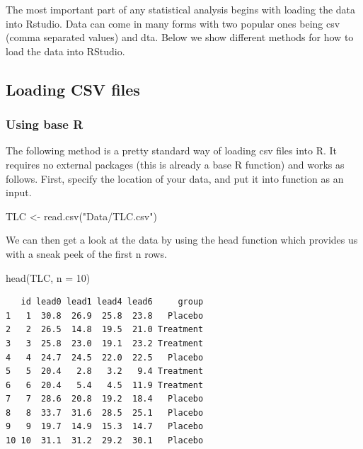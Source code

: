 \documentclass[
  letterpaper,
  DIV=11,
  numbers=noendperiod]{scrreprt}
\newenvironment{Shaded}{\begin{snugshade}}{\end{snugshade}}
\newcommand{\AttributeTok}[1]{\textcolor[rgb]{0.40,0.45,0.13}{#1}}
\newcommand{\DecValTok}[1]{\textcolor[rgb]{0.68,0.00,0.00}{#1}}
\newcommand{\FunctionTok}[1]{\textcolor[rgb]{0.28,0.35,0.67}{#1}}
\newcommand{\NormalTok}[1]{\textcolor[rgb]{0.00,0.23,0.31}{#1}}
\newcommand{\OtherTok}[1]{\textcolor[rgb]{0.00,0.23,0.31}{#1}}
\newcommand{\StringTok}[1]{\textcolor[rgb]{0.13,0.47,0.30}{#1}}
\begin{document}
The most important part of any statistical analysis begins with loading
the data into Rstudio. Data can come in many forms with two popular ones
being csv (comma separated values) and dta. Below we show different
methods for how to load the data into RStudio.

\hypertarget{loading-csv-files}{%
\subsection*{Loading CSV files}\label{loading-csv-files}}

\hypertarget{using-base-r}{%
\subsubsection*{Using base R}\label{using-base-r}}

The following method is a pretty standard way of loading csv files into
R. It requires no external packages (this is already a base R function)
and works as follows. First, specify the location of your data, and put
it into function as an input.

\begin{Shaded}
\begin{Highlighting}[]
\NormalTok{TLC }\OtherTok{\textless{}{-}} \FunctionTok{read.csv}\NormalTok{(}\StringTok{"Data/TLC.csv"}\NormalTok{)}
\end{Highlighting}
\end{Shaded}

We can then get a look at the data by using the head function which
provides us with a sneak peek of the first n rows.

\begin{Shaded}
\begin{Highlighting}[]
\FunctionTok{head}\NormalTok{(TLC, }\AttributeTok{n =} \DecValTok{10}\NormalTok{)}
\end{Highlighting}
\end{Shaded}

\begin{verbatim}
   id lead0 lead1 lead4 lead6     group
1   1  30.8  26.9  25.8  23.8   Placebo
2   2  26.5  14.8  19.5  21.0 Treatment
3   3  25.8  23.0  19.1  23.2 Treatment
4   4  24.7  24.5  22.0  22.5   Placebo
5   5  20.4   2.8   3.2   9.4 Treatment
6   6  20.4   5.4   4.5  11.9 Treatment
7   7  28.6  20.8  19.2  18.4   Placebo
8   8  33.7  31.6  28.5  25.1   Placebo
9   9  19.7  14.9  15.3  14.7   Placebo
10 10  31.1  31.2  29.2  30.1   Placebo
\end{verbatim}
\end{document}
